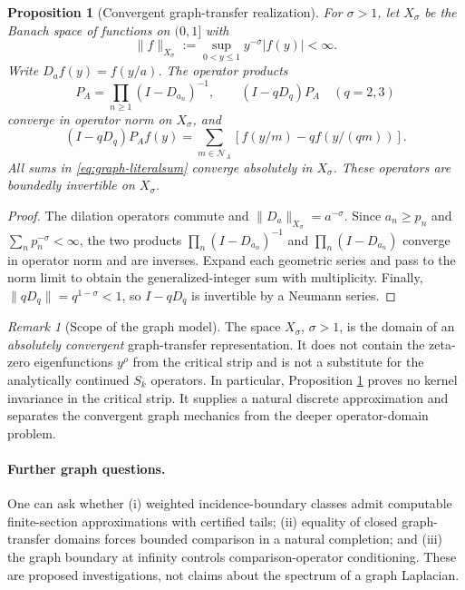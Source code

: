 \documentclass[12pt,letterpaper]{article}
\newtheorem{proposition}[theorem]{Proposition}
\theoremstyle{definition}
\theoremstyle{remark}
\newtheorem{remark}[theorem]{Remark}
\begin{document}
\begin{proposition}[Convergent graph-transfer realization]
\label{prop:graph-transfer}
For \(\sigma>1\), let \(X_\sigma\) be the Banach space of functions
on \((0,1]\) with
\[
 \|f\|_{X_\sigma}:=\sup_{0<y\le1}y^{-\sigma}|f(y)|<\infty.
\]
Write \(D_a f(y)=f(y/a)\).  The operator products
\begin{equation}\label{eq:graph-resolvents}
 P_A=\prod_{n\ge1}(I-D_{a_n})^{-1},
 \qquad
 (I-qD_q)P_A\quad(q=2,3)
\end{equation}
converge in operator norm on \(X_\sigma\), and
\begin{equation}\label{eq:graph-literalsum}
 (I-qD_q)P_Af(y)
 =\sum_{m\in\mathcal N_A}
 \left[f(y/m)-qf(y/(qm))\right].
\end{equation}
All sums in \eqref{eq:graph-literalsum} converge absolutely in
\(X_\sigma\).  These operators are boundedly invertible on
\(X_\sigma\).
\end{proposition}
\begin{proof}
The dilation operators commute and
\(\|D_a\|_{X_\sigma}=a^{-\sigma}\).
Since \(a_n\ge p_n\) and
\(\sum_n p_n^{-\sigma}<\infty\), the two products
\(\prod_n(I-D_{a_n})^{-1}\) and
\(\prod_n(I-D_{a_n})\) converge in operator norm and
are inverses.  Expand each geometric series and pass to the
norm limit to obtain the generalized-integer sum with
multiplicity.  Finally,
\(\|qD_q\|=q^{1-\sigma}<1\), so \(I-qD_q\) is invertible
by a Neumann series.
\end{proof}

\begin{remark}[Scope of the graph model]
The space \(X_\sigma\), \(\sigma>1\), is the domain of an
\emph{absolutely convergent} graph-transfer representation.  It
does not contain the zeta-zero eigenfunctions \(y^\rho\) from the
critical strip and is not a substitute for the analytically
continued \(S_k\) operators.  In particular, Proposition
\ref{prop:graph-transfer} proves no kernel invariance in the
critical strip.  It supplies a natural discrete approximation
and separates the convergent graph mechanics from the deeper
operator-domain problem.
\end{remark}

\paragraph{Further graph questions.}
One can ask whether (i) weighted incidence-boundary classes
admit computable finite-section approximations with certified
tails; (ii) equality of closed graph-transfer domains forces
bounded comparison in a natural completion; and (iii) the
graph boundary at infinity controls comparison-operator
conditioning.  These are proposed investigations, not claims
about the spectrum of a graph Laplacian.
\end{document}

